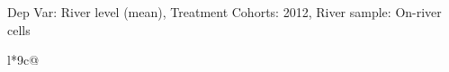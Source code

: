 \begin{table}[H]
\captionlistentry[table]{}
\label{table:beaver_hydrometry_DVlevel_mean_SCg1}
\tiny %
Dep Var: River level (mean), Treatment Cohorts: 2012, River sample: On-river cells \\
\begin{threeparttable}
\begin{tabulary}{\textwidth}{l*{9}{c}@{}}
\toprule \toprule
\noalign{\smallskip}
\noalign{\smallskip}
\midrule \bottomrule
\end{tabulary}
\medskip
\end{threeparttable}
\end{table}
